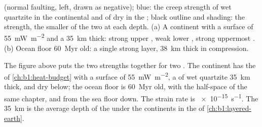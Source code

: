 \begin{omfigure}
{ (normal faulting, left, drawn as negative); blue: the creep strength
of wet quartzite in the continental  and of dry  in the ;
black outline and shading: the strength, the smaller of the two at each
depth. (a) A continent with a surface  of \qty{55}{mW.m^{-2}} and a
 \qty{35}{km} thick: strong upper , weak lower , strong
uppermost . (b) Ocean floor \qty{60}{Myr} old: a single strong layer,
\qty{38}{km} thick in compression.}
\label{fig:b1:stress-strain-rheology:envelope}
\end{omfigure}

The figure above puts the two strengths together
for two . The continent has the  of
\cref{ch:b1:heat-budget} with a surface  of \qty{55}{mW.m^{-2}}, a
 of wet quartzite \qty{35}{km} thick, and dry  below; the ocean
floor is \qty{60}{Myr} old, with the half-space  of the same chapter,
and  from the sea floor down. The strain rate is
\qty{e-15}{s^{-1}}. The \qty{35}{km} is the average depth of the  under
the continents in the  of \cref{ch:b1:layered-earth}.

